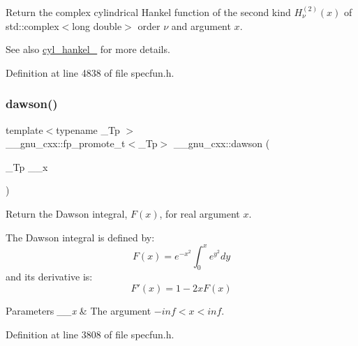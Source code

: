 Return the complex cylindrical Hankel function of the second kind $ H^{(2)}_\nu(x) $ of {\ttfamily std\+::complex$<$long double$>$} order $ \nu $ and argument $ x $.

\begin{DoxySeeAlso}{See also}
\hyperlink{group__gnu__math__spec__func_ga7ebc71dd48ac97255d72f5f5f43dfd8e}{cyl\+\_\+hankel\+\_} for more details. 
\end{DoxySeeAlso}


Definition at line 4838 of file specfun.\+h.

\mbox{\label{group__gnu__math__spec__func_gabc97cbc04fdd23593e8dccbc1421dad5}} 
\subsubsection{\texorpdfstring{dawson()}{dawson()}}
{\footnotesize\ttfamily template$<$typename \+\_\+\+Tp $>$ \\
\+\_\+\+\_\+gnu\+\_\+cxx\+::fp\+\_\+promote\+\_\+t$<$\+\_\+\+Tp$>$ \+\_\+\+\_\+gnu\+\_\+cxx\+::dawson (\begin{DoxyParamCaption}\item[{\+\_\+\+Tp}]{\+\_\+\+\_\+x }\end{DoxyParamCaption})\hspace{0.3cm}{\ttfamily [inline]}}

Return the Dawson integral, $ F(x) $, for real argument $ x $.

The Dawson integral is defined by\+: \[ F(x) = e^{-x^2}\int_0^x e^{y^2}dy \] and it\textquotesingle{}s derivative is\+: \[ F'(x) = 1 - 2xF(x) \]


\begin{DoxyParams}{Parameters}
{\em \+\_\+\+\_\+x} & The argument $ -inf < x < inf $. \\
\hline
\end{DoxyParams}


Definition at line 3808 of file specfun.\+h.

\mbox{\label{group__gnu__math__spec__func_ga0a1b8e6760b8c7869127d41d96209318}} 

